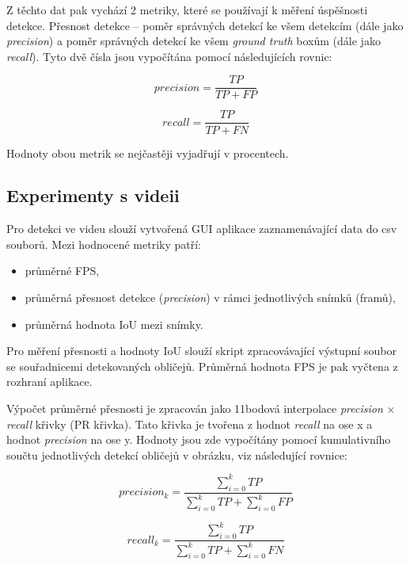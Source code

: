 Z těchto dat pak vychází 2 metriky, které se používají k měření úspěšnosti detekce. Přesnost detekce -- poměr správných detekcí ke všem detekcím (dále jako \emph{precision}) a poměr správných detekcí ke všem \emph{ground truth} boxům (dále jako \emph{recall}). Tyto dvě čísla jsou vypočítána pomocí následujících rovnic:

\begin{equation}
  precision = \frac{TP}{TP + FP}
\end{equation}

\begin{equation}
  recall = \frac{TP}{TP + FN}
\end{equation}

\noindent Hodnoty obou metrik se nejčastěji vyjadřují v procentech.


\subsection*{Experimenty s videii}
Pro detekci ve videu slouží vytvořená GUI aplikace zaznamenávající data do csv souborů. Mezi hodnocené metriky patří:

\begin{itemize}
  \item průměrné FPS,
  \item průměrná přesnost detekce (\emph{precision}) v rámci jednotlivých snímků (framů),
  \item průměrná hodnota IoU mezi snímky.
\end{itemize}

Pro měření přesnosti a hodnoty IoU slouží skript zpracovávající výstupní soubor se souřadnicemi detekovaných obličejů. Průměrná hodnota FPS je pak vyčtena z rozhraní aplikace.

Výpočet průměrné přesnosti je zpracován jako 11bodová interpolace \cite{interpolace} \emph{precision} $\times$ \emph{recall} křivky (PR křivka). Tato křivka je tvořena z hodnot \emph{recall} na ose x a hodnot \emph{precision} na ose y. Hodnoty jsou zde vypočítány pomocí kumulativního součtu jednotlivých detekcí obličejů v obrázku, viz následující rovnice:

\begin{equation}
  precision_k = \frac{\sum_{i=0}^{k} TP}{\sum_{i=0}^{k} TP + \sum_{i=0}^{k} FP}
\end{equation}

\begin{equation}
  recall_k = \frac{\sum_{i=0}^{k} TP}{\sum_{i=0}^{k} TP + \sum_{i=0}^{k} FN}
\end{equation}


